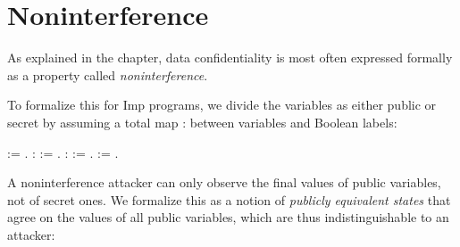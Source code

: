 \documentclass[12pt]{report}
\begin{document}
\section{Noninterference}



 As explained in the  chapter, data
    confidentiality is most often expressed formally as a property
    called \textit{noninterference}.


    To formalize this for Imp programs, we divide the variables as
    either public or secret by assuming a total map  : 
    between variables and Boolean labels: 
\begin{coqdoccode}
\coqdocemptyline
\coqdocnoindent
{}  := .\coqdoceol
\coqdocemptyline
\coqdocnoindent
{}  :  := .\coqdoceol
\coqdocnoindent
{}  :  := .\coqdoceol
\coqdocemptyline
\coqdocnoindent
{}  :=  .\coqdoceol
\coqdocemptyline
\end{coqdoccode}
A noninterference attacker can only observe the final values of public
    variables, not of secret ones. We formalize this as a notion of
    \textit{publicly equivalent states} that agree on the values of all
    public variables, which are thus indistinguishable to an attacker: 
\end{document}
